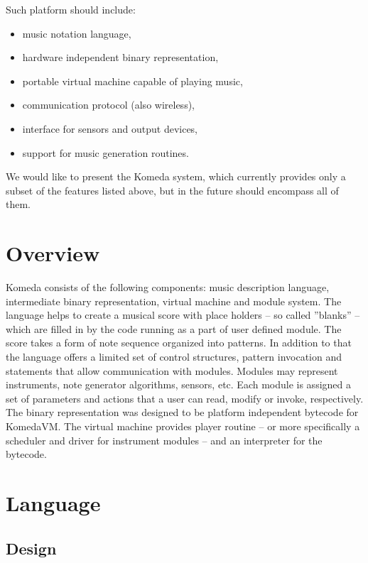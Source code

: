 \documentclass{article}
\begin{document}
Such platform should include:
\begin{itemize}
    \setlength{\itemsep}{0pt}
  \item music notation language,
  \item hardware independent binary representation,
  \item portable virtual machine capable of playing music,
  \item communication protocol (also wireless),
  \item interface for sensors and output devices,
  \item support for music generation routines.
\end{itemize}

We would like to present the Komeda system, which currently provides only a
subset of the features listed above, but in the future should encompass all of
them. 

\section{Overview} 
\label{overview}

Komeda consists of the following components: music description language,
intermediate binary representation, virtual machine and module system. The
language helps to create a musical score with place holders -- so called
''blanks'' -- which are filled in by the code running as a part of user defined
module.  The score takes a form of note sequence organized into patterns.  In
addition to that the language offers a limited set of control structures,
pattern invocation and statements that allow communication with modules.
Modules may represent instruments, note generator algorithms, sensors, etc.
Each module is assigned a set of parameters and actions that a user can read,
modify or invoke, respectively.  The binary representation was designed to be
platform independent bytecode for KomedaVM.  The virtual machine provides
player routine -- or more specifically a scheduler and driver for instrument
modules -- and an interpreter for the bytecode.

\section{Language}
\label{lang}

\subsection{Design}
\label{lang:design}
\end{document}
